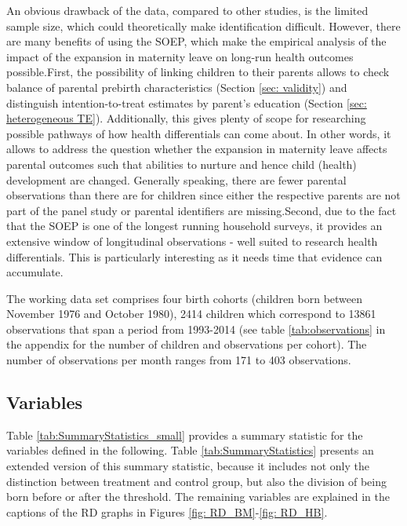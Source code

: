 \documentclass[a4paper ]{article}
\begin{document}
An obvious drawback of the data, compared to other studies, is the limited sample size, which could theoretically make identification difficult. However, there are many benefits of using the SOEP, which make the empirical analysis of the impact of the expansion in maternity leave on long-run health outcomes possible.\newline First, the possibility of linking children to their parents allows to check balance of parental prebirth  characteristics (Section \ref{sec: validity}) and distinguish intention-to-treat estimates by parent's education (Section \ref{sec: heterogeneous TE}). Additionally, this gives plenty of scope for researching possible pathways of how health differentials can come about. In other words, it allows to address the question whether the expansion in maternity leave affects parental outcomes such that abilities to nurture and hence child (health) development are changed. Generally speaking, there are fewer parental observations than there are for children since either the respective parents are not part of the panel study or parental identifiers are missing.\newline Second, due to the fact that the SOEP is one of the longest running household surveys, it provides an extensive window of longitudinal observations - well suited to research health differentials. This is particularly interesting as it needs time that evidence can accumulate.\newline 


The working data set comprises four birth cohorts (children born between November 1976 and October 1980), 2414 children which correspond to 13861 observations that span a period from 1993-2014 (see table \ref{tab:observations} in the appendix for the number of children and observations per cohort). The number of observations per month ranges from 171 to 403 observations.






\bigskip 
\subsection{ Variables}\label{sec:variables}



Table \ref{tab:SummaryStatistics_small} provides a summary statistic for the variables defined in the following. Table \ref{tab:SummaryStatistics} presents an extended version of this summary statistic, because it includes not only the distinction between treatment and control group, but also the division of being born before or after the threshold. The remaining variables are explained in the captions of the RD graphs in Figures \ref{fig: RD_BM}-\ref{fig: RD_HB}. \newline
\end{document}
